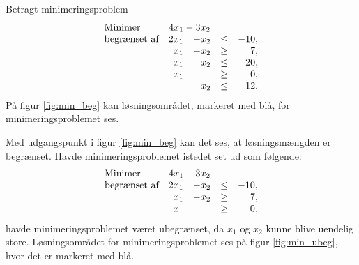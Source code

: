 \begin{eks}
Betragt minimeringsproblem
%
\begin{align*}
\begin{array}{lrrlr}
\text{Minimer}		&	\multicolumn{2}{c}{4x_1-3x_2}  &\\
\text{begrænset af}	&2x_1& - x_2			&\leq 	&-10,\\
					&x_1& - x_2				&\geq	& 7,\\
					&x_1& + x_2				&\leq	& 20,\\
					&x_1&					&\geq	& 0,\\
					& &x_2					&\leq	& 12.
\end{array}
\end{align*}
%
På figur \ref{fig:min_beg} kan løsningsområdet, markeret med blå, for minimeringsproblemet ses.
%

\noindent
%
Med udgangspunkt i figur \ref{fig:min_beg} kan det ses, at løsningsmængden er begrænset.
% 
Havde minimeringsproblemet istedet set ud som følgende: 
%
\begin{align*}
\begin{array}{lrrlr}
\text{Minimer}		&\multicolumn{2}{c}{4x_1-3x_2}  &\\
\text{begrænset af}	&2x_1& - x_2			&\leq 	&-10,\\
					&x_1& - x_2				&\geq	& 7,\\
					&x_1&					&\geq	& 0,
\end{array}
\end{align*}
havde minimeringsproblemet været ubegrænset, da $x_1$ og $x_2$ kunne blive uendelig store. 
Løsningsområdet for minimeringsproblemet ses på figur \ref{fig:min_ubeg}, hvor det er markeret med blå.
%

%
\end{eks}